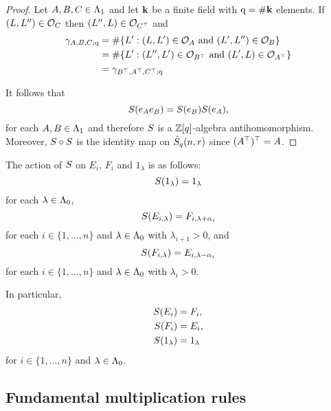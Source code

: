 \documentclass[a4paper, 11pt]{report}
\begin{document}
\begin{proof}
Let $A,B,C\in\Lambda_1{}$ and let $\mathbf{k}$ be a finite field with $\mathrm{q}=\#\mathbf{k}$ elements. If $(L,L'')\in\mathcal{O}_{C}$ then $(L'',L)\in\mathcal{O}_{C^\top}$ and
\begin{align*}
\gamma_{A,B,C;\mathrm{q}}
&= \#\{L': (L,L')\in\mathcal{O}_{A}\text{ and } (L',L'')\in\mathcal{O}_{B}\}\\
&= \#\{L': (L'',L')\in\mathcal{O}_{B^\top}\text{ and } (L',L)\in\mathcal{O}_{A^\top}\}\\
&= \gamma_{B^\top,A^\top, C^\top;\mathrm{q}}
\end{align*}

It follows that
\begin{equation*}
S{(e_A e_B)} = S{(e_B)} S{(e_A)},
\end{equation*}
for each $A,B\in\Lambda_1{}$ and therefore $S{}$ is a $\mathbb{Z}[q]$-algebra antihomomorphism. Moreover, $S{}\circ S{}$ is the identity map on $\hat{S}_q(n,r)$ since $(A^\top)^\top = A$.
\end{proof}

The action of $S{}$ on $E_i$, $F_i$ and $1_\lambda$ is as follows:
\begin{equation*}
S{(1_\lambda)} = 1_\lambda
\end{equation*}
for each $\lambda\in\Lambda_0{}$,
\begin{equation*}
S{(E_{i,\lambda})} = F_{i,\lambda+\alpha_i}
\end{equation*}
for each $i\in\{1,\ldots,n\}$ and $\lambda\in\Lambda_0{}$ with $\lambda_{i+1}>0$, and
\begin{equation*}
S{(F_{i,\lambda})} = E_{i,\lambda -\alpha_i}
\end{equation*}
for each $i\in\{1,\ldots,n\}$ and $\lambda\in\Lambda_0{}$ with $\lambda_i>0$.

In particular,
\begin{align*}
S{(E_i)} &= F_i,\\
S{(F_i)} &= E_i,\\
S{(1_\lambda)} &= 1_\lambda
\end{align*}
for $i\in\{1,\ldots,n\}$ and $\lambda\in\Lambda_0{}$.

\subsection{Fundamental multiplication rules}
\end{document}
